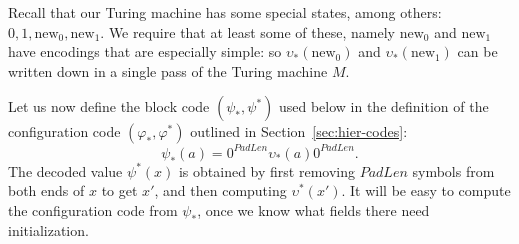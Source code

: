 \documentclass[11pt]{memoir}
\theoremstyle{definition} %
\newcommand{\PadLen}{\mathit{PadLen}} %
\newcommand{\new}{\mathrm{new}}
\begin{document}
Recall that our Turing machine has some special states, among others: \( 0,1,\new_{0},\new_{1} \).
We require that at least some of these, namely \( \new_{0} \) and \( \new_{1} \) have encodings
that are especially simple: so \( \upsilon_{*}(\new_{0}) \) and \( \upsilon_{*}(\new_{1}) \) can be
written down in a single pass of the Turing machine \( M \).

Let us now define the block code \( (\psi_{*}, \psi^{*}) \) used below in the
definition of the configuration code \( (\varphi_{*}, \varphi^{*}) \)  
outlined in Section~\ref{sec:hier-codes}:
\begin{equation}\label{eq:psi}
   \psi_{*}(a)  = 0^{\PadLen}\upsilon_{*}(a)0^{\PadLen}.
\end{equation}
The decoded value \( \psi^{*}(x) \) is obtained by first removing \( \PadLen \)
symbols from both ends of \( x \) to get \( x' \), and then computing \(
\upsilon^{*}(x') \).
 It will be easy to compute the configuration code from \( \psi_{*} \),
once we know what fields there need initialization.




\end{document}

